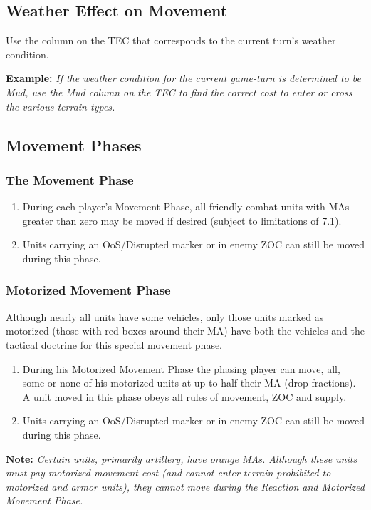 \subsection{Weather Effect on Movement}
Use the column on the TEC that corresponds to the current turn's weather condition.

\textbf{Example:} \textit{If the weather condition for the current game-turn is determined to be Mud, use the Mud column on the TEC to find the correct cost to enter or cross the various terrain types.}

\subsection{Movement Phases}
\subsubsection{The Movement Phase}

\begin{enumerate}[label=\alph*.]
    \item During each player's Movement Phase, all friendly combat units with MAs greater than zero may be moved if desired (subject to limitations of 7.1).
    \item Units carrying an OoS/Disrupted marker or in enemy ZOC can still be moved during this phase.
\end{enumerate}

\subsubsection{Motorized Movement Phase}
Although nearly all units have some vehicles, only those units marked as motorized (those with red boxes around their MA) have both the vehicles and the tactical doctrine for this special movement phase.

\begin{enumerate}[label=\alph*.]
    \item During his Motorized Movement Phase the phasing player can move, all, some or none of his motorized units at up to half their MA (drop fractions). A unit moved in this phase obeys all rules of movement, ZOC and supply.
    \item Units carrying an OoS/Disrupted marker or in enemy ZOC can still be moved during this phase.
\end{enumerate}
\nohyphens{
\textbf{Note:} \textit{Certain units, primarily artillery, have orange MAs. Although these units must pay motorized movement cost (and cannot enter terrain prohibited to motorized and armor units), they cannot move during the Reaction and Motorized Movement Phase.}
}

